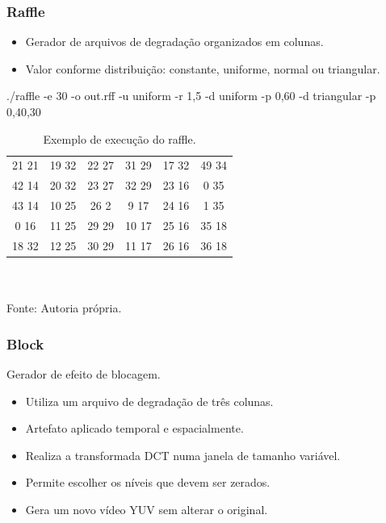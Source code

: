     \begin{frame}\frametitle{Raffle}
        \begin{itemize}
            \item Gerador de arquivos de degradação organizados em colunas.
            \item Valor conforme distribuição: constante, uniforme, normal ou triangular.
        \end{itemize}
        ./raffle -e 30 -o out.rff -u uniform -r 1,5 -d uniform -p 0,60 -d triangular -p 0,40,30
        \begin{table}[!h]
            \centering
            \caption{Exemplo de execução do raffle.}
            \label{tab:rafflerun}
            \begin{tabular}{|c|c|c|c|c|c|}
                \hline
                21 21 & 19 32 & 22 27 & 31 29 & 17 32 & 49 34 \\
                42 14 & 20 32 & 23 27 & 32 29 & 23 16 &  0 35 \\
                43 14 & 10 25 & 26  2 &  9 17 & 24 16 &  1 35 \\
                 0 16 & 11 25 & 29 29 & 10 17 & 25 16 & 35 18 \\
                18 32 & 12 25 & 30 29 & 11 17 & 26 16 & 36 18 \\
                \hline
            \end{tabular}
			\\ ~ \\
			\tiny
			Fonte: Autoria própria.
        \end{table}
    \end{frame}

    \begin{frame}\frametitle{Block}
        Gerador de efeito de blocagem.
        \begin{itemize}
            \item Utiliza um arquivo de degradação de três colunas.
            \item Artefato aplicado temporal e espacialmente.
            \item Realiza a transformada DCT numa janela de tamanho variável.
            \item Permite escolher os níveis que devem ser zerados.
            \item Gera um novo vídeo YUV sem alterar o original.
        \end{itemize}
    \end{frame}
    
